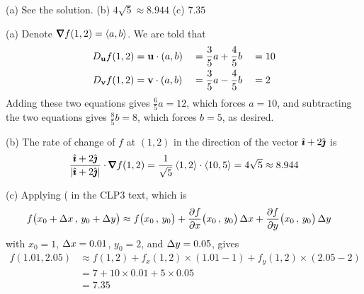
\begin{answer}
(a) See the solution.\qquad
(b) $4\sqrt{5}\approx 8.944$\qquad
(c) $7.35$
\end{answer}

\begin{solution}
(a)
Denote $\vnabla f(1,2)= \llt a,b\rgt$. We are told that
\begin{alignat*}{3}
D_{\mathbf{u}} f(1,2)&=\mathbf{u}\cdot(a,b)&&=\frac{3}{5}a+\frac{4}{5}b&&=10 \\
D_{\mathbf{v}} f(1,2)&=\mathbf{v}\cdot(a,b)&&=\frac{3}{5}a-\frac{4}{5}b&&=2
\end{alignat*}
Adding these two equations gives $\frac{6}{5}a=12$, which forces $a=10$,
and subtracting the two equations gives $\frac{8}{5}b=8$, which forces
$b=5$, as desired.

(b) The rate of change of $f$ at $(1,2)$ in the direction
of the vector $\hat{\pmb{\imath}}+2\hat{\pmb{\jmath}}$ is
\begin{align*}
\frac{\hi+2\hj}{|\hi+2\hj|}\cdot \vnabla f(1,2)
=\frac{1}{\sqrt{5}}\llt 1,2\rgt\cdot\llt 10,5\rgt
=4\sqrt{5}\approx 8.944
\end{align*}

(c) Applying ( in the CLP3 text, which is
\begin{align*}
f\big(x_0+\De x\,,\,y_0+\De y\big)
&\approx f\big(x_0\,,\,y_0\big) 
       + \pdiff{f}{x}\big(x_0\,,\,y_0\big)\,\De x
       + \pdiff{f}{y}\big(x_0\,,\,y_0\big)\,\De y
\end{align*}
with $x_0=1$, $\Delta x=0.01$, $y_0=2$, and $\Delta y=0.05$, gives
\begin{align*}
f(1.01,2.05)
&\approx f(1,2)+f_x(1,2)\times(1.01-1)+f_y(1,2)\times(2.05-2) \\
&=7+10\times0.01+5\times0.05 \\
&=7.35
\end{align*}
\end{solution}

